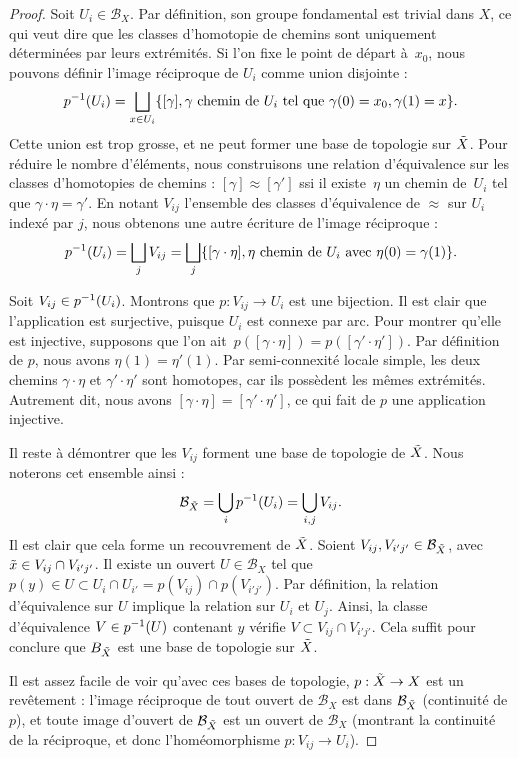 \begin{proof}
Soit $U_i\in\mathcal{B}_X$. Par définition, son groupe fondamental est trivial dans $X$, ce qui veut dire que les classes d'homotopie de chemins sont uniquement déterminées par leurs extrémités. Si l'on fixe le point de départ à~$x_0$, nous pouvons définir l'image réciproque de $U_i$ comme union disjointe :\[p^{-1}(U_i)=\bigsqcup_{x\in U_i}\{[\gamma],\gamma\text{ chemin de $U_i$ tel que }\gamma(0)=x_0,\gamma(1)=x\}.\]Cette union est trop grosse, et ne peut former une base de topologie sur $\Tilde{X}$. Pour réduire le nombre d'éléments, nous construisons une relation d'équivalence sur les classes d'homotopies de chemins : $[\gamma]\approx[\gamma']$ ssi il existe~$\eta$ un chemin de~$U_i$ tel que $\gamma\cdot\eta=\gamma'$. En notant $V_{ij}$ l'ensemble des classes d'équivalence de $\approx$ sur $U_i$ indexé par $j$, nous obtenons une autre écriture de l'image réciproque : \[p^{-1}(U_i)=\bigsqcup_{j}V_{ij}=\bigsqcup_j\{[\gamma\cdot\eta],\eta\text{ chemin de $U_i$ avec $\eta(0)=\gamma(1)$}\}.\]

Soit $V_{ij}\in p^{-1}(U_i)$. Montrons que $p:V_{ij}\to U_i$ est une bijection. Il est clair que l'application est surjective, puisque $U_i$ est connexe par arc. Pour montrer qu'elle est injective, supposons que l'on ait~$p([\gamma\cdot\eta])=p([\gamma'\cdot\eta'])$. Par définition de $p$, nous avons $\eta(1)=\eta'(1)$. Par semi-connexité locale simple, les deux chemins $\gamma\cdot\eta$ et $\gamma'\cdot\eta'$ sont homotopes, car ils possèdent les mêmes extrémités. Autrement dit, nous avons $[\gamma\cdot\eta]=[\gamma'\cdot\eta']$, ce qui fait de $p$ une application injective.

Il reste à démontrer que les $V_{ij}$ forment une base de topologie de $\Tilde{X}$. Nous noterons cet ensemble ainsi : \[\mathcal{B}_{\Tilde{X}}=\bigcup_ip^{-1}(U_i)=\bigcup_{i,j}V_{ij}.\] Il est clair que cela forme un recouvrement de $\Tilde{X}$. Soient $V_{ij},V_{i'j'}\in\mathcal{B}_{\Tilde{X}}$, avec $\Tilde{x}\in V_{ij}\cap V_{i'j'}$. Il existe un ouvert $U\in \mathcal{B}_X$ tel que~${p(y)\in U\subset U_i\cap U_{i'}=p(V_{ij})\cap p(V_{i'j'})}$. Par définition, la relation d'équivalence sur $U$ implique la relation sur $U_i$ et $U_j$. Ainsi, la classe d'équivalence $V\in p^{-1}(U)$ contenant $y$ vérifie $V\subset V_{ij}\cap V_{i'j'}$. Cela suffit pour conclure que $B_{\Tilde{X}}$ est une base de topologie sur $\Tilde{X}$.

Il est assez facile de voir qu'avec ces bases de topologie, $p:\Tilde{X}\to X$ est un revêtement : l'image réciproque de tout ouvert de $\mathcal{B}_X$ est dans $\mathcal{B}_{\Tilde{X}}$ (continuité de $p$), et toute image d'ouvert de $\mathcal{B}_{\Tilde{X}}$ est un ouvert de $\mathcal{B}_X$ (montrant la continuité de la réciproque, et donc l'homéomorphisme $p:V_{ij}\to U_i$).


\end{proof}
